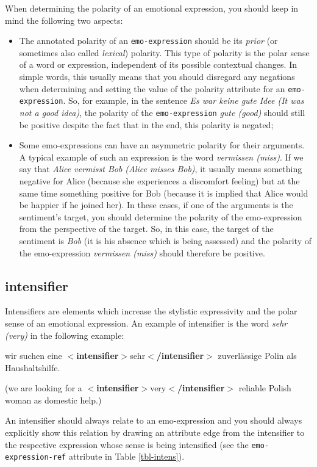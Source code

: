 \documentclass[11pt,a4paper]{article}
\newcommand{\xmltag}[1]{{\textbf{\small$<$#1$>$}}}
\newcommand{\intensifier}[1]{\xmltag{intensifier}#1\xmltag{/intensifier}}
\newenvironment{myexe}{
  \begin{exe}
    \ex\begin{center}
    \itshape
}{
    \end{center}
  \end{exe}
}
\begin{document}
When determining the polarity of an emotional expression, you should keep in
mind the following two aspects:
\begin{itemize}
  \item The annotated polarity of an \texttt{emo-expression} should be
    its \textit{prior} (or sometimes also called \textit{lexical})
    polarity.  This type of polarity is the polar sense of a word or
    expression, independent of its possible contextual changes.  In
    simple words, this usually means that you should disregard any
    negations when determining and setting the value of the polarity
    attribute for an \texttt{emo-expression}. So, for example, in the
    sentence \textit{Es war keine gute Idee (It was not a good idea)},
    the polarity of the \texttt{emo-expression} \textit{gute (good)}
    should still be positive despite the fact that in the end, this
    polarity is negated;

  \item Some emo-expressions can have an asymmetric polarity for their
    arguments.  A typical example of such an expression is the word
    \textit{vermissen (miss)}.  If we say that \textit{Alice vermisst
      Bob (Alice misses Bob)}, it usually means something negative for
    Alice (because she experiences a discomfort feeling) but at the
    same time something positive for Bob (because it is implied that
    Alice would be happier if he joined her).  In these cases, if one
    of the arguments is the sentiment's target, you should determine
    the polarity of the emo-expression from the perspective of the
    target.  So, in this case, the target of the sentiment is
    \textit{Bob} (it is his absence which is being assessed) and the
    polarity of the emo-expression \textit{vermissen (miss)} should
    therefore be positive.
\end{itemize}

\subsection{intensifier}
Intensifiers are elements which increase the stylistic expressivity
and the polar sense of an emotional expression.  An example of
intensifier is the word \textit{sehr (very)} in the following example:
\begin{myexe}
  wir suchen eine \intensifier{sehr} zuverl\"assige Polin als
  Haushaltshilfe.

  (we are looking for a \intensifier{very} reliable Polish woman as
  domestic help.)
\end{myexe}
An intensifier should always relate to an emo-expression and you
should always explicitly show this relation by drawing an attribute
edge from the intensifier to the respective expression whose sense is
being intensified (see the \texttt{emo-expression-ref} attribute in
Table \ref{tbl-intens}).
\end{document}
